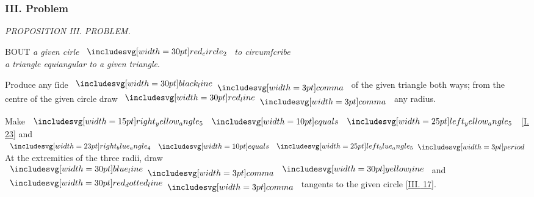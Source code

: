 \documentclass[12pt,preview]{standalone}
\begin{document}
\subsubsection{III. Problem}

\begin{minipage}[t]{0.64\textwidth}
    \vspace{0pt}

    \begin{center}
        \textit{PROPOSITION III. PROBLEM.}\label{book4pr3} \\
    \end{center}

    \hfill

    \begin{center}
        \raggedright \lettrine[lines=4, loversize=1, nindent=0pt]{}{}BOUT \textit{a given cirle} $\img[0][0][30]{red_circle_2}$ \textit{to circumſcribe\\ a triangle equiangular to a given triangle}.
    \end{center}

    \hfill

    \hfill

    \hfill

    Produce any ſide $\blackline \bcomma$ of the given triangle both ways; from the centre of the given circle draw $\redline \bcomma$ any radius.

    \hfill

    \begin{center}
        Make $\img[0][0][15]{right_yellow_angle_5} \bequals \img{left_yellow_angle_5}$ [\hyperref[book1pr23]{\textsc{I.} 23}] and $\img[0][0][23]{right_blue_angle_4} \bequals \img{left_blue_angle_5} \bperiod$\\
        At the extremities of the three radii, draw $\blueline \bcomma \yellowline$ and\\
        $\dottedredline \bcomma$ tangents to the given circle [\hyperref[book3pr17]{\textsc{III.} 17}].
    \end{center}

    \hfill


\end{minipage}
\end{document}
